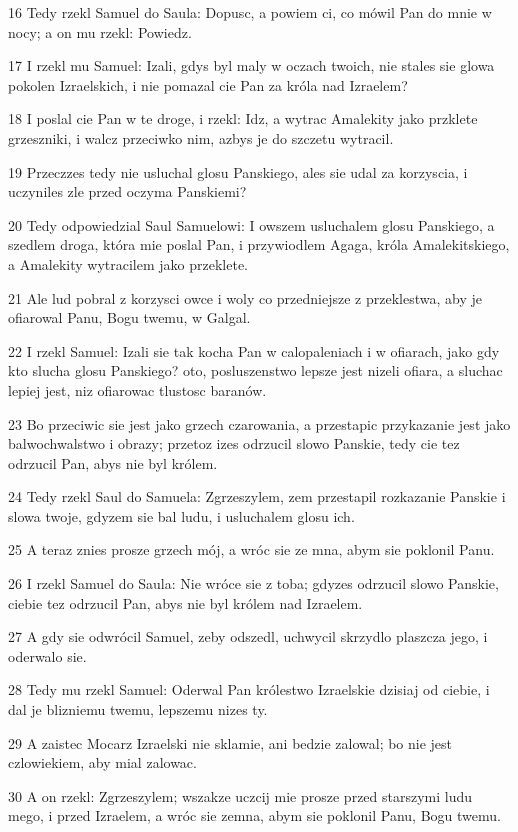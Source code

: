 \par 16 Tedy rzekl Samuel do Saula: Dopusc, a powiem ci, co mówil Pan do mnie w nocy; a on mu rzekl: Powiedz.
\par 17 I rzekl mu Samuel: Izali, gdys byl maly w oczach twoich, nie stales sie glowa pokolen Izraelskich, i nie pomazal cie Pan za króla nad Izraelem?
\par 18 I poslal cie Pan w te droge, i rzekl: Idz, a wytrac Amalekity jako przklete grzeszniki, i walcz przeciwko nim, azbys je do szczetu wytracil.
\par 19 Przeczzes tedy nie usluchal glosu Panskiego, ales sie udal za korzyscia, i uczyniles zle przed oczyma Panskiemi?
\par 20 Tedy odpowiedzial Saul Samuelowi: I owszem usluchalem glosu Panskiego, a szedlem droga, która mie poslal Pan, i przywiodlem Agaga, króla Amalekitskiego, a Amalekity wytracilem jako przeklete.
\par 21 Ale lud pobral z korzysci owce i woly co przedniejsze z przeklestwa, aby je ofiarowal Panu, Bogu twemu, w Galgal.
\par 22 I rzekl Samuel: Izali sie tak kocha Pan w calopaleniach i w ofiarach, jako gdy kto slucha glosu Panskiego? oto, posluszenstwo lepsze jest nizeli ofiara, a sluchac lepiej jest, niz ofiarowac tlustosc baranów.
\par 23 Bo przeciwic sie jest jako grzech czarowania, a przestapic przykazanie jest jako balwochwalstwo i obrazy; przetoz izes odrzucil slowo Panskie, tedy cie tez odrzucil Pan, abys nie byl królem.
\par 24 Tedy rzekl Saul do Samuela: Zgrzeszylem, zem przestapil rozkazanie Panskie i slowa twoje, gdyzem sie bal ludu, i usluchalem glosu ich.
\par 25 A teraz znies prosze grzech mój, a wróc sie ze mna, abym sie poklonil Panu.
\par 26 I rzekl Samuel do Saula: Nie wróce sie z toba; gdyzes odrzucil slowo Panskie, ciebie tez odrzucil Pan, abys nie byl królem nad Izraelem.
\par 27 A gdy sie odwrócil Samuel, zeby odszedl, uchwycil skrzydlo plaszcza jego, i oderwalo sie.
\par 28 Tedy mu rzekl Samuel: Oderwal Pan królestwo Izraelskie dzisiaj od ciebie, i dal je blizniemu twemu, lepszemu nizes ty.
\par 29 A zaistec Mocarz Izraelski nie sklamie, ani bedzie zalowal; bo nie jest czlowiekiem, aby mial zalowac.
\par 30 A on rzekl: Zgrzeszylem; wszakze uczcij mie prosze przed starszymi ludu mego, i przed Izraelem, a wróc sie zemna, abym sie poklonil Panu, Bogu twemu.
